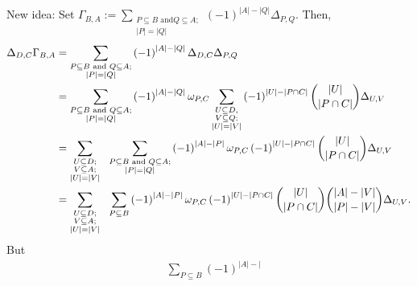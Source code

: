 \documentclass[numbers=enddot,12pt,final,onecolumn,notitlepage]{scrartcl}%
\numberwithin{exer}{subsection}
\theoremstyle{definition}
\let\sumnonlimits\sum
\renewcommand{\sum}{\sumnonlimits\limits}
\newenvironment{noncompile}{}{}
\begin{document}
\begin{noncompile}
New idea: Set $\Gamma_{B,A}:=\sum_{\substack{P\subseteq B\text{ and
}Q\subseteq A;\\\left\vert P\right\vert =\left\vert Q\right\vert }}\left(
-1\right)  ^{\left\vert A\right\vert -\left\vert Q\right\vert }\Delta_{P,Q}$.
Then,%
\begin{align*}
\Delta_{D,C}\Gamma_{B,A}  &  =\sum_{\substack{P\subseteq B\text{ and
}Q\subseteq A;\\\left\vert P\right\vert =\left\vert Q\right\vert }}\left(
-1\right)  ^{\left\vert A\right\vert -\left\vert Q\right\vert }\Delta
_{D,C}\Delta_{P,Q}\\
&  =\sum_{\substack{P\subseteq B\text{ and }Q\subseteq A;\\\left\vert
P\right\vert =\left\vert Q\right\vert }}\left(  -1\right)  ^{\left\vert
A\right\vert -\left\vert Q\right\vert }\omega_{P,C}\sum_{\substack{U\subseteq
D,\\V\subseteq Q;\\\left\vert U\right\vert =\left\vert V\right\vert }}\left(
-1\right)  ^{\left\vert U\right\vert -\left\vert P\cap C\right\vert }%
\dbinom{\left\vert U\right\vert }{\left\vert P\cap C\right\vert }\Delta
_{U,V}\\
&  =\sum_{\substack{U\subseteq D;\\V\subseteq A;\\\left\vert U\right\vert
=\left\vert V\right\vert }}\ \ \sum_{\substack{P\subseteq B\text{ and
}Q\subseteq A;\\\left\vert P\right\vert =\left\vert Q\right\vert }}\left(
-1\right)  ^{\left\vert A\right\vert -\left\vert P\right\vert }\omega
_{P,C}\left(  -1\right)  ^{\left\vert U\right\vert -\left\vert P\cap
C\right\vert }\dbinom{\left\vert U\right\vert }{\left\vert P\cap C\right\vert
}\Delta_{U,V}\\
&  =\sum_{\substack{U\subseteq D;\\V\subseteq A;\\\left\vert U\right\vert
=\left\vert V\right\vert }}\ \ \sum_{P\subseteq B}\left(  -1\right)
^{\left\vert A\right\vert -\left\vert P\right\vert }\omega_{P,C}\left(
-1\right)  ^{\left\vert U\right\vert -\left\vert P\cap C\right\vert }%
\dbinom{\left\vert U\right\vert }{\left\vert P\cap C\right\vert }%
\dbinom{\left\vert A\right\vert -\left\vert V\right\vert }{\left\vert
P\right\vert -\left\vert V\right\vert }\Delta_{U,V}.
\end{align*}
But%
\begin{align*}
&  \sum_{P\subseteq B}\left(  -1\right)  ^{\left\vert A\right\vert -\left\vert
}
\end{align*}
\end{noncompile}
\end{document}
